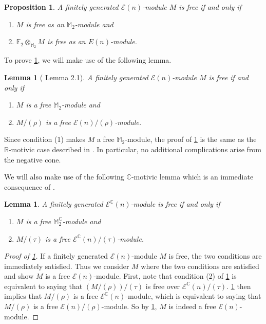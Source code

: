 \documentclass{amsart}
\newtheorem{lemma}[equation]{Lemma}
\newtheorem{proposition}[equation]{Proposition}
\theoremstyle{plain}
\numberwithin{equation}{section}
\numberwithin{figure}{section}
\newcommand{\mC}{{\mathbb C}}
\newcommand{\mF}{{\mathbb F}}
\newcommand{\mM}{{\mathbb M}}
\newcommand{\mR}{{\mathbb R}}
\newcommand{\cE}{{\mathcal E}}
\newcommand{\0}{\langle 0 \rangle }
\begin{document}
\begin{proposition} \label{prop:mFree}
A finitely generated $\cE(n)$-module $M$ is free if and only if
\begin{enumerate}
    \item $M$ is free as an $\mM_2$-module and
    \item $\mF_2 {\otimes}_{\mM_2} M$ is free as an $E(n)$-module.
\end{enumerate}
\end{proposition}

To prove \cref{prop:mFree}, we will make use of the following lemma. 

\begin{lemma}[\cite{BGL2022} Lemma 2.1] \label{lem:mfree}
A finitely generated $\cE(n)$-module $M$ is free if and only if 
\begin{enumerate}
    \item $M$ is a free $\mM_2$-module and
    \item $M / (\rho)$ is a free $\cE(n) / (\rho)$-module.
\end{enumerate}
\end{lemma}

Since condition (1) makes $M$ a free $\mM_2$-module, the proof of \cref{lem:mfree} is the same as the $\mR$-motivic case described in \cite[Lemma~2.1]{BGL2022}. In particular, no additional complications arise from the negative cone. 

We will also make use of the following $\mC$-motivic lemma which is an immediate consequence of \cite[Theorem~B~(i)]{HK2018}.

\begin{lemma}\cite[Theorem~B]{HK2018}\label{lem:mfreeoverC}
A finitely generated $\cE^{\mC}(n)$-module is free if and only if
\begin{enumerate}
    \item $M$ is a free $\mM^{\mC}_{2}$-module and
    \item $M/(\tau)$ is a free $\cE^{\mC}(n)/(\tau)$-module.
\end{enumerate}
\end{lemma}

\begin{proof}[Proof of \cref{prop:mFree}]
If a finitely generated $\cE(n)$-module $M$ is free, the two conditions are immediately satisfied. Thus we consider $M$ where the two conditions are satisfied and show $M$ is a free $\cE(n)$-module. First, note that condition (2) of \cref{prop:mFree} is equivalent to saying that $(M/(\rho))/(\tau)$ is free over $\cE^{\mC}(n)/(\tau)$. \cref{lem:mfreeoverC} then implies that $M/(\rho)$ is a free $\cE^{\mC}(n)$-module, which is equivalent to saying that $M/(\rho)$ is a free $\cE(n)/(\rho)$-module. So by \cref{lem:mfree}, $M$ is indeed a free $\cE(n)$-module.
\end{proof}
\end{document}
